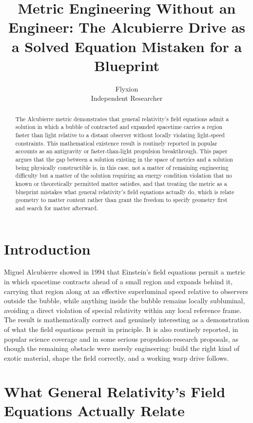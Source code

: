 \documentclass[11pt]{article}
\title{Metric Engineering Without an Engineer: The Alcubierre Drive as a Solved Equation Mistaken for a Blueprint}
\author{Flyxion \\ \small Independent Researcher}
\date{}
\begin{document}
\maketitle

\begin{abstract}
The Alcubierre metric demonstrates that general relativity's field equations admit a solution in which a bubble of contracted and expanded spacetime carries a region faster than light relative to a distant observer without locally violating light-speed constraints. This mathematical existence result is routinely reported in popular accounts as an antigravity or faster-than-light propulsion breakthrough. This paper argues that the gap between a solution existing in the space of metrics and a solution being physically constructible is, in this case, not a matter of remaining engineering difficulty but a matter of the solution requiring an energy condition violation that no known or theoretically permitted matter satisfies, and that treating the metric as a blueprint mistakes what general relativity's field equations actually do, which is relate geometry to matter content rather than grant the freedom to specify geometry first and search for matter afterward.
\end{abstract}

\section{Introduction}

Miguel Alcubierre showed in 1994 that Einstein's field equations permit a metric in which spacetime contracts ahead of a small region and expands behind it, carrying that region along at an effective superluminal speed relative to observers outside the bubble, while anything inside the bubble remains locally subluminal, avoiding a direct violation of special relativity within any local reference frame. The result is mathematically correct and genuinely interesting as a demonstration of what the field equations permit in principle. It is also routinely reported, in popular science coverage and in some serious propulsion-research proposals, as though the remaining obstacle were merely engineering: build the right kind of exotic material, shape the field correctly, and a working warp drive follows.

\section{What General Relativity's Field Equations Actually Relate}
\end{document}
